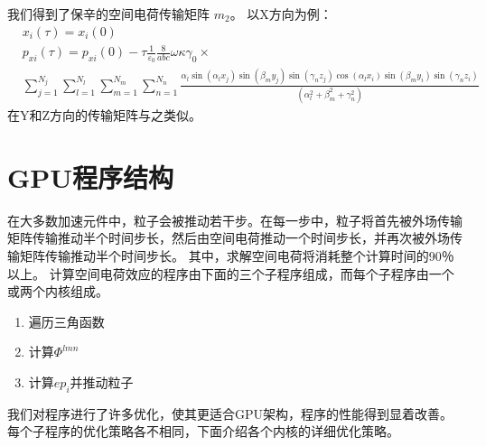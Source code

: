 我们得到了保辛的空间电荷传输矩阵 ${{m}_{2}}$。 以X方向为例：
\begin{align}
&{{x}_{i}}(\tau )= {{x}_{i}}(0) \\
 \nonumber &{{p}_{xi}}(\tau )= {{p}_{xi}}(0)-\tau \frac{1}{{{\varepsilon }_{0}}}\frac{8}{abc}\omega \kappa {{\gamma }_{0}} \times \\
 &\sum\limits_{j=1}^{{{N}_{j}}}{\sum\limits_{l=1}^{{{N}_{l}}}{\sum\limits_{m=1}^{{{N}_{m}}}{\sum\limits_{n=1}^{{{N}_{n}}}{\frac{{{\alpha }_{l}}\sin ({{\alpha }_{l}}{{x}_{j}})\sin ({{\beta }_{m}}{{y}_{j}})\sin ({{\gamma }_{n}}{{z}_{j}})\cos ({{\alpha }_{l}}{{x}_{i}})\sin ({{\beta }_{m}}{{y}_{i}})\sin ({{\gamma }_{n}}{{z}_{i}})}{(\alpha _{l}^{2}+\beta _{m}^{2}+\gamma _{n}^{2})}}}}}\label{eq:map1}
\end{align}
在Y和Z方向的传输矩阵与之类似。

\section{GPU程序结构}            \label{section:code}
在大多数加速元件中，粒子会被推动若干步。在每一步中，粒子将首先被外场传输矩阵传输推动半个时间步长，然后由空间电荷推动一个时间步长，并再次被外场传输矩阵传输推动半个时间步长。
其中，求解空间电荷将消耗整个计算时间的90％以上。 计算空间电荷效应的程序由下面的三个子程序组成，而每个子程序由一个或两个内核组成。
\begin{enumerate}
  \item 遍历三角函数
  \item 计算$\Phi^{lmn}$
  \item 计算$ep_i$并推动粒子
\end{enumerate}

我们对程序进行了许多优化，使其更适合GPU架构，程序的性能得到显着改善。 每个子程序的优化策略各不相同，下面介绍各个内核的详细优化策略。
